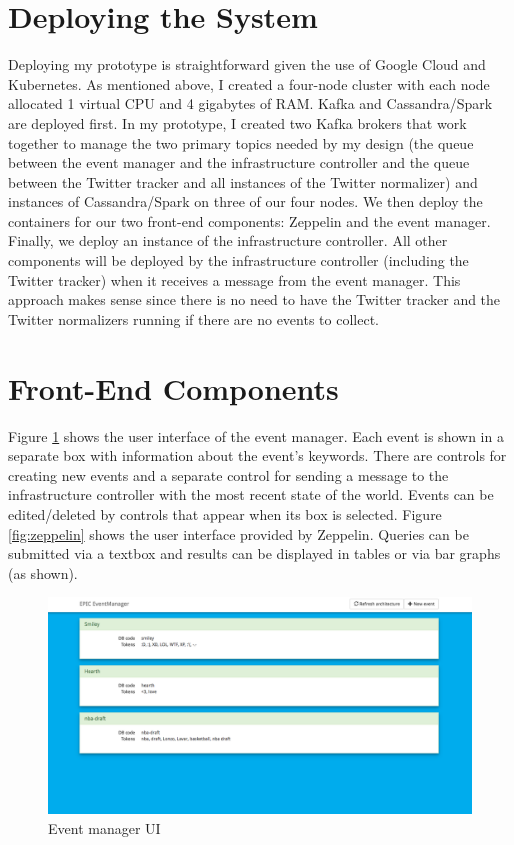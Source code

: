 \section{Deploying the System}

Deploying my prototype is straightforward given the use of Google Cloud and Kubernetes. As mentioned above, I created a four-node cluster with each node allocated 1 virtual CPU and 4 gigabytes of RAM. Kafka and Cassandra/Spark are deployed first. In my prototype, I created two Kafka brokers that work together to manage the two primary topics needed by my design (the queue between the event manager and the infrastructure controller and the queue between the Twitter tracker and all instances of the Twitter normalizer) and instances of Cassandra/Spark on three of our four nodes. We then deploy the containers for our two front-end components: Zeppelin and the event manager. Finally, we deploy an instance of the infrastructure controller. All other components will be deployed by the infrastructure controller (including the Twitter tracker) when it receives a message from the event manager. This approach makes sense since there is no need to have the Twitter tracker and the Twitter normalizers running if there are no events to collect.

\newpage
\section{Front-End Components}

Figure \ref{fig:eventmanager} shows the user interface of the event manager. Each event is shown in a separate box with information about the event’s keywords. There are controls for creating new events and a separate control for sending a message to the infrastructure controller with the most recent state of the world. Events can be edited/deleted by controls that appear when its box is selected. Figure \ref{fig:zeppelin} shows the user interface provided by Zeppelin. Queries can be submitted via a textbox and results can be displayed in tables or via bar graphs (as shown).

\begin{figure}
\centering
\includegraphics[width=\textwidth]{Figures/eventmanager}
\decoRule
\caption[Event Manager UI]{Event manager UI}
\label{fig:eventmanager}
\end{figure}

